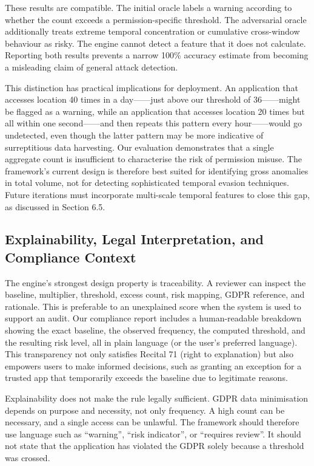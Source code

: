 These results are compatible. The initial oracle labels a warning according to whether the count exceeds a permission-specific threshold. The adversarial oracle additionally treats extreme temporal concentration or cumulative cross-window behaviour as risky. The engine cannot detect a feature that it does not calculate. Reporting both results prevents a narrow 100\% accuracy estimate from becoming a misleading claim of general attack detection.

This distinction has practical implications for deployment. An application that accesses location 40 times in a day——just above our threshold of 36——might be flagged as a warning, while an application that accesses location 20 times but all within one second——and then repeats this pattern every hour——would go undetected, even though the latter pattern may be more indicative of surreptitious data harvesting. Our evaluation demonstrates that a single aggregate count is insufficient to characterise the risk of permission misuse. The framework's current design is therefore best suited for identifying gross anomalies in total volume, not for detecting sophisticated temporal evasion techniques. Future iterations must incorporate multi-scale temporal features to close this gap, as discussed in Section 6.5.

\subsection{Explainability, Legal Interpretation, and Compliance Context}

The engine's strongest design property is traceability. A reviewer can inspect the baseline, multiplier, threshold, excess count, risk mapping, GDPR reference, and rationale. This is preferable to an unexplained score when the system is used to support an audit. Our compliance report includes a human-readable breakdown showing the exact baseline, the observed frequency, the computed threshold, and the resulting risk level, all in plain language (or the user's preferred language). This transparency not only satisfies Recital 71 (right to explanation) but also empowers users to make informed decisions, such as granting an exception for a trusted app that temporarily exceeds the baseline due to legitimate reasons.

Explainability does not make the rule legally sufficient. GDPR data minimisation depends on purpose and necessity, not only frequency. A high count can be necessary, and a single access can be unlawful. The framework should therefore use language such as ``warning'', ``risk indicator'', or ``requires review''. It should not state that the application has violated the GDPR solely because a threshold was crossed.

